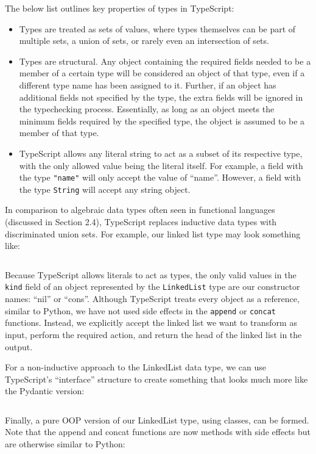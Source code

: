 \documentclass{article}
\begin{document}
The below list outlines key properties of types in TypeScript:
\begin{itemize}
    \item Types are treated as sets of values, where types themselves can be part of multiple sets,
    a union of sets, or rarely even an intersection of sets.
    \item Types are structural. Any object containing the required fields needed to be a member of a certain type
    will be considered an object of that type, even if a different type name has been assigned to it.
    Further, if an object has additional fields not specified by the type,
    the extra fields will be ignored in the typechecking process. Essentially, as long as an object meets the minimum
    fields required by the specified type, the object is assumed to be a member of that type.
    \item TypeScript allows any literal string to act as a subset of its respective type,
    with the only allowed value being the literal itself.
    For example, a field with the type \texttt{"name"} will only accept the value of ``name''.
    However, a field with the type \texttt{String} will accept any string object.

\end{itemize}

In comparison to algebraic data types often seen in functional languages (discussed in Section 2.4), TypeScript replaces inductive data types
with discriminated union sets. For example, our linked list type may look something like:
\inputminted{typescript}{linked_list/main.ts}

Because TypeScript allows literals to act as types, the only valid values in the \texttt{kind} field
of an object represented by the \texttt{LinkedList} type are our constructor names: ``nil'' or ``cons''.
Although TypeScript treats every object as a reference, similar to Python, we have not used side effects
in the \texttt{append} or \texttt{concat} functions. Instead, we explicitly accept the linked list we want to transform as
input, perform the required action, and return the head of the linked list in the output.

For a non-inductive approach to the LinkedList data type, we can use TypeScript's ``interface'' structure to create something that
looks much more like the Pydantic version:
\inputminted{typescript}{linked_list/main_interface.ts}

Finally, a pure OOP version of our LinkedList type, using classes, can be formed.
Note that the append and concat functions are now methods with side effects but are otherwise similar to Python:
\inputminted{typescript}{linked_list/main_class.ts}
\end{document}
